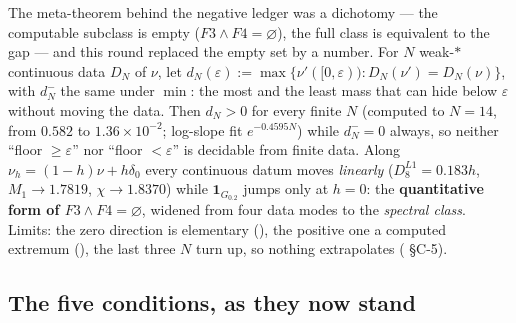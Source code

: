 The meta-theorem behind the negative ledger was a dichotomy --- the computable subclass is empty
($F3\wedge F4=\varnothing$), the full class is equivalent to the gap --- and this round replaced the
empty set by a number. For $N$ weak-$*$ continuous data $D_N$ of $\nu$, let
$d_N(\varepsilon):=\max\{\nu'([0,\varepsilon)):D_N(\nu')=D_N(\nu)\}$, with $d_N^{-}$ the same under
$\min$: the most and the least mass that can hide below $\varepsilon$ without moving the data. Then
$d_N>0$ for every finite $N$ (computed to $N=14$, from $0.582$ to $1.36\times10^{-2}$; log-slope fit
$e^{-0.4595N}$) while $d_N^{-}=0$ always, so neither ``floor $\ge\varepsilon$'' nor ``floor
$<\varepsilon$'' is decidable from finite data. Along $\nu_h=(1-h)\nu+h\delta_0$ every continuous
datum moves \emph{linearly} ($D_8^{L1}=0.183h$, $M_1\to1.7819$, $\chi\to1.8370$) while
$\mathbf 1_{G_{0.2}}$ jumps only at $h=0$: the \textbf{quantitative form of
$F3\wedge F4=\varnothing$}, widened from four data modes to the \emph{spectral class}. Limits: the
zero direction is elementary (\LT), the positive one a computed extremum (\LE), the last three $N$ turn
up, so nothing extrapolates ( \S C-5).

\subsection{The five conditions, as they now stand}

